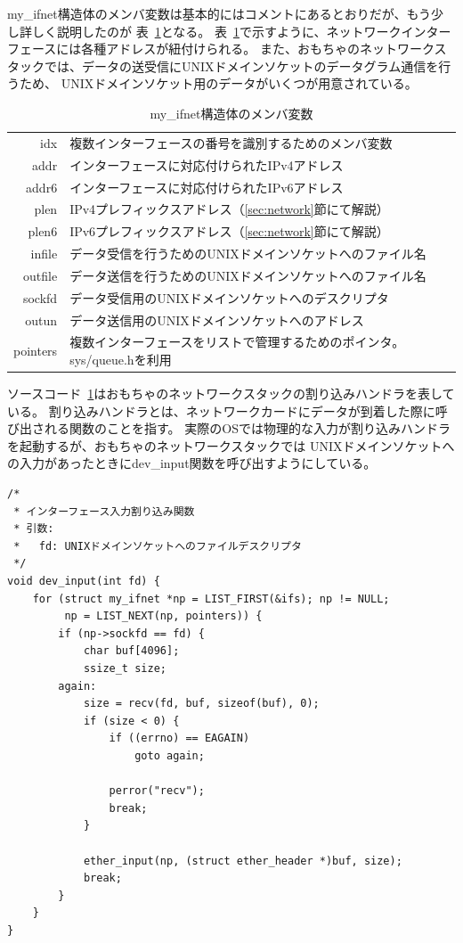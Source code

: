 my\_ifnet構造体のメンバ変数は基本的にはコメントにあるとおりだが、もう少し詳しく説明したのが
表~\ref{tab:my_ifnet}となる。
表~\ref{tab:my_ifnet}で示すように、ネットワークインターフェースには各種アドレスが紐付けられる。
また、おもちゃのネットワークスタックでは、データの送受信にUNIXドメインソケットのデータグラム通信を行うため、
UNIXドメインソケット用のデータがいくつが用意されている。

\begin{table}[tb]
    \centering
    \caption{my\_ifnet構造体のメンバ変数} \label{tab:my_ifnet}
    \begin{tabular}{rl}
        idx & 複数インターフェースの番号を識別するためのメンバ変数 \\
        addr & インターフェースに対応付けられたIPv4アドレス \\
        addr6 & インターフェースに対応付けられたIPv6アドレス \\
        plen & IPv4プレフィックスアドレス（\ref{sec:network}節にて解説） \\
        plen6 & IPv6プレフィックスアドレス（\ref{sec:network}節にて解説） \\
        infile & データ受信を行うためのUNIXドメインソケットへのファイル名 \\
        outfile & データ送信を行うためのUNIXドメインソケットへのファイル名 \\
        sockfd & データ受信用のUNIXドメインソケットへのデスクリプタ \\
        outun & データ送信用のUNIXドメインソケットへのアドレス \\
        pointers & 複数インターフェースをリストで管理するためのポインタ。sys/queue.hを利用 \\
    \end{tabular}
\end{table}

ソースコード~\ref{tab:my_ifnet}はおもちゃのネットワークスタックの割り込みハンドラを表している。
割り込みハンドラとは、ネットワークカードにデータが到着した際に呼び出される関数のことを指す。
実際のOSでは物理的な入力が割り込みハンドラを起動するが、おもちゃのネットワークスタックでは
UNIXドメインソケットへの入力があったときにdev\_input関数を呼び出すようにしている。

\begin{lstlisting}[caption=割り込みハンドラ (my\_ifnet.c),label=src:my_ifnet.c]
/*
 * インターフェース入力割り込み関数
 * 引数:
 *   fd: UNIXドメインソケットへのファイルデスクリプタ
 */
void dev_input(int fd) {
    for (struct my_ifnet *np = LIST_FIRST(&ifs); np != NULL;
         np = LIST_NEXT(np, pointers)) {
        if (np->sockfd == fd) {
            char buf[4096];
            ssize_t size;
        again:
            size = recv(fd, buf, sizeof(buf), 0);
            if (size < 0) {
                if ((errno) == EAGAIN)
                    goto again;

                perror("recv");
                break;
            }

            ether_input(np, (struct ether_header *)buf, size);
            break;
        }
    }
}
\end{lstlisting}

